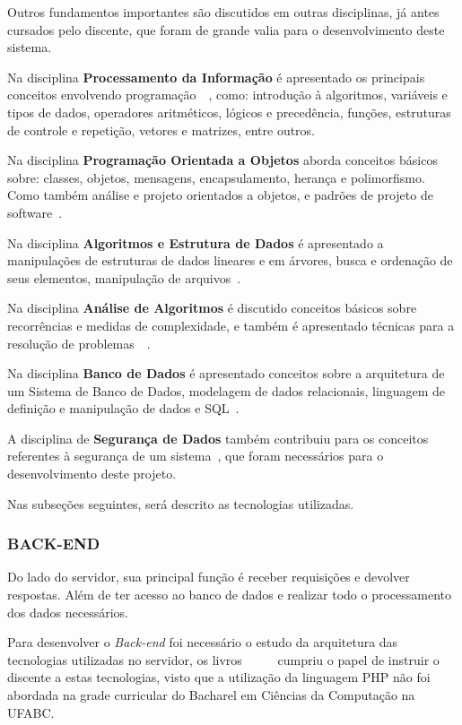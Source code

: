 \documentclass[
  12pt,				%
  openany,
  oneside,
  a4paper,			%
  english,			%
  brazil
]{article}
\numberwithin{figure}{section}
\numberwithin{table}{section}
\begin{document}
Outros fundamentos importantes são discutidos em outras disciplinas, já antes cursados pelo discente, que foram de grande valia para o desenvolvimento deste sistema. 

Na disciplina \textbf{Processamento da Informação} é apresentado os principais conceitos envolvendo programação~\cite{BCC1}~\cite{BCC2}, como: introdução à algoritmos, variáveis e tipos de dados, operadores aritméticos, lógicos e precedência, funções, estruturas de controle e repetição, vetores e matrizes, entre outros.

Na disciplina \textbf{Programação Orientada a Objetos} aborda conceitos básicos sobre: classes, objetos, mensagens, encapsulamento, herança e polimorfismo. Como também análise e projeto orientados a objetos, e padrões de projeto de software~\cite{POO_deitel}.

Na disciplina \textbf{Algoritmos e Estrutura de Dados} é apresentado a  manipulações de estruturas de dados lineares e em árvores, busca e ordenação de seus elementos, manipulação de arquivos~\cite{AED_cormen1}.

Na disciplina \textbf{Análise de Algoritmos} é discutido conceitos básicos sobre recorrências e medidas de complexidade, e também é apresentado técnicas para a resolução de problemas~\cite{AED_cormen1}~\cite{AED_cormen2}.

Na disciplina \textbf{Banco de Dados} é apresentado conceitos sobre a arquitetura de um Sistema de Banco de Dados, modelagem de dados relacionais, linguagem de definição e manipulação de dados e SQL~\cite{BD}.

A disciplina de \textbf{Segurança de Dados} também contribuiu para os conceitos referentes à segurança de um sistema~\cite{SegDados}, que foram necessários para o desenvolvimento deste projeto.

Nas subseções seguintes, será descrito as tecnologias utilizadas.

\subsubsection{BACK-END}
Do lado do servidor, sua principal função é receber requisições e devolver respostas. Além de ter acesso ao banco de dados e realizar todo o processamento dos dados necessários.

Para desenvolver o \textit{Back-end} foi necessário o estudo da arquitetura das tecnologias utilizadas no servidor, os livros~\cite{PHP_Novatec_poo}~\cite{PHP_Novatec_dev}~\cite{PHP_Novatec_appWeb}~\cite{PHP_mysql}~\cite{PHP_Novatec_ajax} cumpriu o papel de instruir o discente a estas tecnologias, visto que a utilização da linguagem PHP não foi abordada na grade curricular do Bacharel em Ciências da Computação na UFABC.
\end{document}
